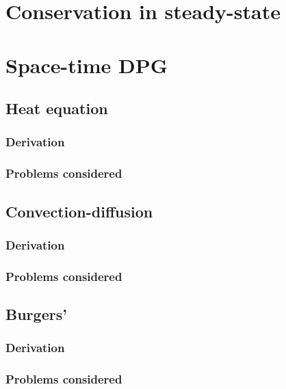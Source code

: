 \documentclass{report}
\begin{document}
\chapter{Conservation in steady-state}




\chapter{Space-time DPG}



\section{Heat equation}

\subsection{Derivation}

\subsection{Problems considered}


\section{Convection-diffusion}

\subsection{Derivation}

\subsection{Problems considered}


\section{Burgers'}

\subsection{Derivation}

\subsection{Problems considered}
\end{document}
